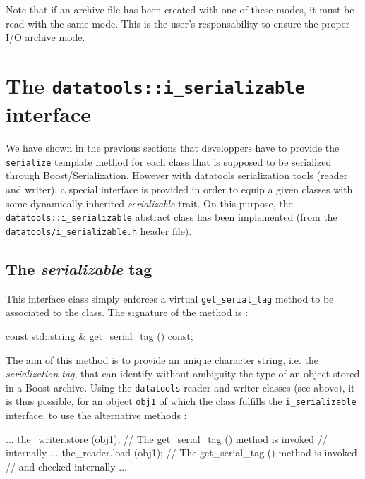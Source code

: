 \documentclass[a4paper,12pt]{article}
\newcommand{\pn}{\par\noindent}
\begin{document}
\pn Note that if an archive file has been created with one of these modes,
it must be read with the same mode. This is the user's responsability to ensure
the proper I/O archive mode.

\clearpage
\section{The \texttt{datatools::i\_serializable} interface}

\pn We  have shown in the  previous sections that  developpers have to
provide the \texttt{serialize} template  method for each class that is
supposed to  be serialized through  Boost/Serialization.  However with
datatools serialization tools (reader and writer), a special interface
is provided  in order to equip  a given classes  with some dynamically
inherited   \emph{serializable}   trait.    On   this   purpose,   the
\texttt{datatools::i\_serializable}    abstract    class   has    been
implemented  (from   the  \texttt{datatools/i\_serializable.h}  header
file).

\subsection{The \emph{serializable} tag}

\pn    This    interface    class    simply   enforces    a    virtual
\texttt{get\_serial\_tag} method  to be  associated to the  class. The
signature of the method is :

\begin{CppVerbatim}
const std::string & get_serial_tag () const;
\end{CppVerbatim}

\pn The aim  of this method is to provide  an unique character string,
i.e. the \emph{serialization tag}, that can identify without ambiguity
the  type  of  an  object   stored  in  a  Boost  archive.  Using  the
\texttt{datatools} reader  and writer classes (see above),  it is thus
possible, for an object \texttt{obj1}  of which the class fulfills the
\texttt{i\_serializable} interface, to use the alternative methods :
\begin{CppVerbatim}
  ...
  the_writer.store (obj1); // The get_serial_tag () method is invoked
                           // internally
  ...
  the_reader.load (obj1);  // The get_serial_tag () method is invoked
                           // and checked internally
  ...
\end{CppVerbatim}
\end{document}
